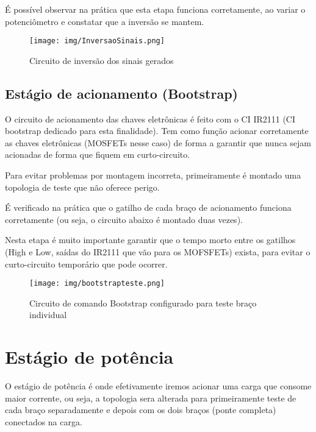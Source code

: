 \documentclass[journal, a4paper]{IEEEtran}
\begin{document}
É possível observar na prática que esta etapa funciona corretamente, ao variar o potenciômetro e constatar que a inversão se mantem.

\begin{figure}[H]\begin{center}
	\texttt{[image: img/InversaoSinais.png]} 
	\caption{Circuito de inversão dos sinais gerados}   
	\label{fig:tf_p}
\end{center}\end{figure}

\subsection{Estágio de acionamento (Bootstrap)}

O circuito de acionamento das chaves eletrônicas é feito com o CI IR2111 (CI bootstrap dedicado para esta finalidade). Tem como função acionar corretamente as chaves eletrônicas (MOSFETs nesse caso) de forma a garantir que nunca sejam acionadas de forma que fiquem em curto-circuito.

Para evitar problemas por montagem incorreta, primeiramente é montado uma topologia de teste que não oferece perigo.

É verificado na prática que o gatilho de cada braço de acionamento funciona corretamente (ou seja, o circuito abaixo é montado duas vezes).

Nesta etapa é muito importante garantir que o tempo morto entre os gatilhos (High e Low, saídas do IR2111 que vão para os MOFSFETs) exista, para evitar o curto-circuito temporário que pode ocorrer.

\begin{figure}[H]\begin{center}
	\texttt{[image: img/bootstrapteste.png]} 
	\caption{Circuito de comando Bootstrap configurado para teste braço individual}   
	\label{fig:tf_p}
\end{center}\end{figure}

\section{Estágio de potência}

O estágio de potência é onde efetivamente iremos acionar uma carga que consome maior corrente, ou seja, a topologia sera alterada para primeiramente teste de cada braço separadamente e depois com os dois braços (ponte completa) conectados na carga.
\end{document}
